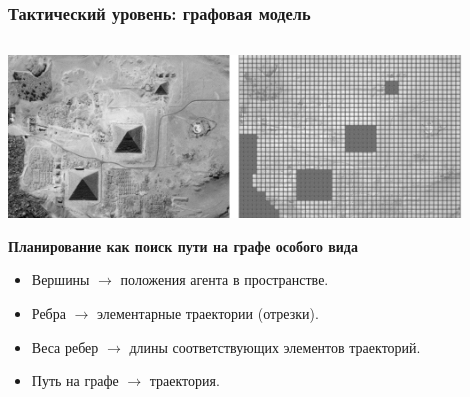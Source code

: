 \documentclass[default]{beamer}
\begin{document}
	\begin{frame}
		\frametitle{Тактический уровень: графовая модель}
		\scriptsize
		\begin{columns}
			\begin{column}{0.6\textwidth}
				\includegraphics[width=0.9\textwidth]{grid.png}
				
				\textbf{Планирование как поиск пути на графе особого вида}
				\begin{itemize}
					\item Вершины $\rightarrow$ положения агента в пространстве.
					\item Ребра $\rightarrow$ элементарные траектории (отрезки).
					\item Веса ребер $\rightarrow$ длины соответствующих элементов траекторий.
					\item Путь на графе $\rightarrow$ траектория.
				\end{itemize}
				\par\medskip
				

\end{column}
\end{columns}
\end{frame}
\end{document}
